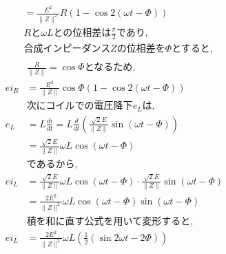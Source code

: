 \documentclass[twocolumn]{article}
\begin{document}
\begin{enumerate}
\begin{align*}
               & = \frac{E^2}{\|Z\|^2} R \left( 1-\cos2\left(\omega t - \Phi\right)\right)                                                          \\
               & R\text{と}\omega L \text{との位相差は} \frac{\pi}{2} \text{であり,}                                                                          \\
               & \text{合成インピーダンス}Z\text{の位相差を}\Phi \text{とすると,}                                                                                     \\
        \end{align*}
        \begin{align*}
               & \frac{R}{\|Z\|} = \cos \Phi \text{となるため,}                                                                                           \\
          ei_R & = \frac{E^2}{\|Z\|} \cos \Phi \left( 1-\cos2\left(\omega t - \Phi\right)\right)                                                     \\
               & \text{次にコイルでの電圧降下}e_L \text{は,}                                                                                                     \\
          e_L  & = L \frac{di}{dt} = L \frac{d}{dt} \left( \frac{\sqrt{2}E}{\|Z\|} \sin \left( \omega t - \Phi\right) \right)                        \\
               & = \frac{\sqrt{2}E}{\|Z\|} \omega L \cos \left(\omega t - \Phi\right)                                                                \\
               & \text{であるから,}                                                                                                                       \\
          ei_L & = \frac{\sqrt{2}E}{\|Z\|}\omega L \cos\left(\omega t - \Phi\right) \cdot \frac{\sqrt{2}E}{\|Z\|} \sin \left( \omega t - \Phi\right) \\
               & = \frac{2E^2}{\|Z\|^2} \omega L \cos\left(\omega t - \Phi\right)\sin\left(\omega t - \Phi\right)                                    \\
               & \text{積を和に直す公式を用いて変形すると,}                                                                                                           \\
          ei_L & = \frac{2E^2}{\|Z\|^2}\omega L \left(\frac{1}{2} \left(\sin 2\omega t - 2\Phi\right)\right)                                         \\

\end{align*}
\end{enumerate}
\end{document}
